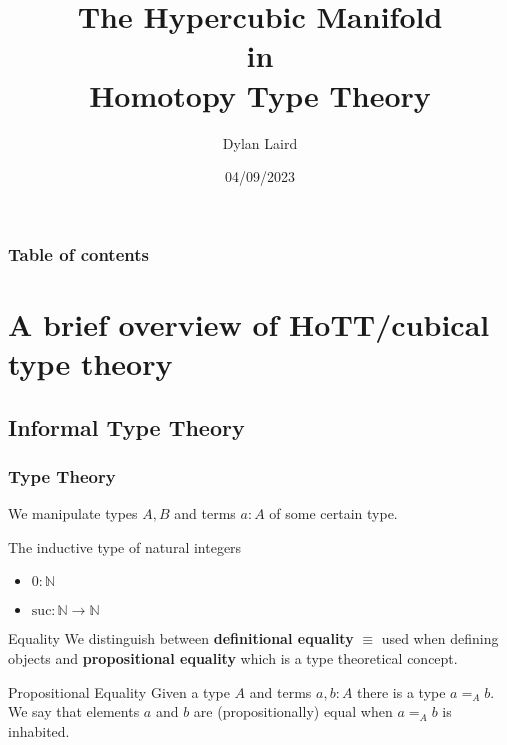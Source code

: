 \documentclass{beamer}
\title{
    The Hypercubic Manifold\\
    in\\
    Homotopy Type Theory}
\date{04/09/2023}
\author{Dylan Laird}
\begin{document}
\frame{\titlepage}

\begin{frame}
    \frametitle{Table of contents}
    \tableofcontents
\end{frame}
\section{A brief overview of HoTT/cubical type theory}
    \subsection{Informal Type Theory}
        \begin{frame}
            \frametitle{Type Theory}
            We manipulate types $A,B$ and terms $a : A$ of some certain type. \\
            \pause
            \begin{exampleblock}{The inductive type of natural integers}
                \begin{itemize}
                    \item $0 : \mathbb N$
                    \item $\mathrm{suc}: \mathbb N \rightarrow \mathbb N$
                \end{itemize}
            \end{exampleblock}
            \pause
            \begin{block}{Equality}
                We distinguish between \textbf{definitional equality} $\equiv$ used when defining objects and \textbf{propositional equality} which is a type theoretical concept.
            \end{block}
            \pause
            \begin{exampleblock}{Propositional Equality}
                Given a type $A$ and terms $a,b : A$ there is a type $a=_A b$. We say that elements $a$ and $b$ are (propositionally) equal when $a=_A b$ is inhabited.
            \end{exampleblock}
        \end{frame}
\end{document}
